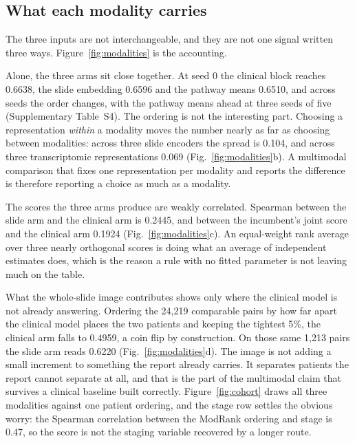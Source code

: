 \documentclass[unnumsec,webpdf,contemporary,large]{oup-authoring-template}
\begin{document}
\subsection{What each modality carries}

The three inputs are not interchangeable, and they are not one signal written three ways.
Figure~\ref{fig:modalities} is the accounting.

Alone, the three arms sit close together. At seed 0 the clinical block reaches 0.6638, the slide
embedding 0.6596 and the pathway means 0.6510, and across seeds the order changes, with the
pathway means ahead at three seeds of five (Supplementary Table~S4). The ordering is not the
interesting part. Choosing a representation \emph{within} a modality moves the number nearly as
far as choosing between modalities: across three slide encoders the spread is 0.104, and across
three transcriptomic representations 0.069 (Fig.~\ref{fig:modalities}b). A multimodal comparison
that fixes one representation per modality and reports the difference is therefore reporting a
choice as much as a modality.

The scores the three arms produce are weakly correlated. Spearman between the slide arm and the
clinical arm is 0.2445, and between the incumbent's joint score and the clinical arm 0.1924
(Fig.~\ref{fig:modalities}c). An equal-weight rank average over three nearly orthogonal scores is
doing what an average of independent estimates does, which is the reason a rule with no fitted
parameter is not leaving much on the table.

What the whole-slide image contributes shows only where the clinical model is not already
answering. Ordering the 24,219 comparable pairs by how far apart the clinical model places the two
patients and keeping the tightest 5\%, the clinical arm falls to 0.4959, a coin flip by
construction. On those same 1,213 pairs the slide arm reads 0.6220
(Fig.~\ref{fig:modalities}d). The image is not adding a small increment to something the report
already carries. It separates patients the report cannot separate at all, and that is the part of
the multimodal claim that survives a clinical baseline built correctly.
Figure~\ref{fig:cohort} draws all three modalities against one patient ordering, and the stage row
settles the obvious worry: the Spearman correlation between the ModRank ordering and stage is
0.47, so the score is not the staging variable recovered by a longer route.
\end{document}
